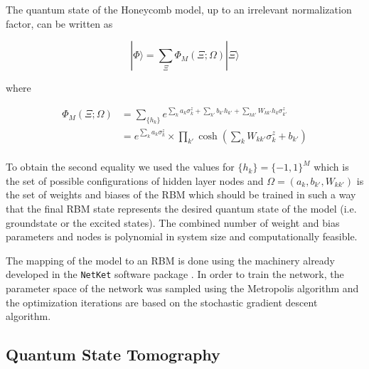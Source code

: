 \documentclass{article}
\begin{document}
The quantum state of the Honeycomb model, up to an irrelevant normalization factor, can be written as 

\begin{equation}\label{eq:19_0}
    |\Phi\rangle=\sum_{\Xi}\Phi_{M}(\Xi;\Omega)|\Xi\rangle
\end{equation}{}

where

\begin{equation}\label{eq:19_1}
    \begin{aligned}
        \Phi_{M}(\Xi;\Omega) &=  \sum_{\{h_{k}\}}e^{\sum_{k}a_{k}\sigma_{k}^{z}+\sum_{k'}b_{k'}h_{k'}+\sum_{kk'}W_{kk'}h_{k}\sigma_{k'}^{z}}\\
        &= e^{\sum_k a_k \sigma_k^z} \times \prod_{k'} \cosh \left(\sum_k W_{kk'} \sigma_k^z + b_{k'} \right)
    \end{aligned}
\end{equation}\\

To obtain the second equality we used the values for $\{h_{k}\}=\{-1,1\}^{M}$ which is the set of possible configurations of hidden layer nodes and $\Omega=(a_{k},b_{k'},W_{kk'})$ is the set of weights and biases of the RBM which should be trained in such a way that the final RBM state represents the desired quantum state of the model (i.e. groundstate or the excited states). The combined number of weight and bias parameters and nodes is polynomial in system size and computationally feasible.


The mapping of the model to an RBM is done using the machinery already developed in the \texttt{NetKet} software package \cite{netket:2019}. In order to train the network, the parameter space of the network was sampled using the Metropolis algorithm and the optimization iterations are based on the stochastic gradient descent algorithm. 

\subsection{Quantum State Tomography}
\label{sec3.2}
\end{document}
